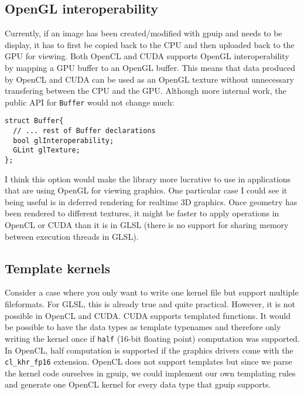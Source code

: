 \subsection{OpenGL interoperability}

Currently, if an image has been created/modified with gpuip and needs to be display, it has to first be copied back to the CPU and then uploaded back to the GPU for viewing. Both OpenCL and CUDA supports OpenGL interoperability by mapping a GPU buffer to an OpenGL buffer. This means that data produced by OpenCL and CUDA can be used as an OpenGL texture without unnecessary transfering between the CPU and the GPU. Although more internal work, the public API for {\tt Buffer} would not change much:
\newline
\renewcommand{\lstlistingname}{Code}
\begin{lstlisting}[caption= gpuip OpenGL interoperability, label=glinter]
struct Buffer{
  // ... rest of Buffer declarations 
  bool glInteroperability;
  GLint glTexture;
};
\end{lstlisting}

I think this option would make the library more lucrative to use in applications that are using OpenGL for viewing graphics. One particular case I could see it being useful is in deferred rendering for realtime 3D graphics. Once geometry has been rendered to different textures, it might be faster to apply operations in OpenCL or CUDA than it is in GLSL (there is no support for sharing memory between execution threads in GLSL).

\subsection{Template kernels}

Consider a case where you only want to write one kernel file but support multiple fileformats. For GLSL, this is already true and quite practical. However, it is not possible in OpenCL and CUDA. CUDA supports templated functions. It would be possible to have the data types as template typenames and therefore only writing the kernel once if {\tt half} (16-bit floating point) computation was supported. In OpenCL, half computation is supported if the graphics drivers come with the {\tt cl\_khr\_fp16} extension. OpenCL does not support templates but since we parse the kernel code ourselves in gpuip, we could implement our own templating rules and generate one OpenCL kernel for every data type that gpuip supports. 

